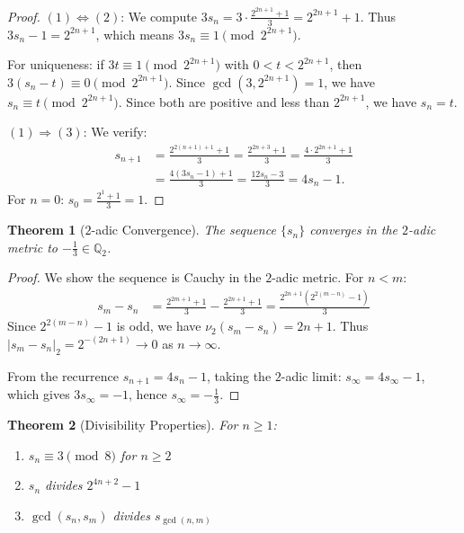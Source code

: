 \documentclass[11pt]{article}
\newtheorem{theorem}{Theorem}[section]
\theoremstyle{definition}
\newcommand{\Q}{\mathbb{Q}}
\begin{document}
\begin{proof}
$(1) \Leftrightarrow (2)$: We compute $3s_n = 3 \cdot \frac{2^{2n+1} + 1}{3} = 2^{2n+1} + 1$.
Thus $3s_n - 1 = 2^{2n+1}$, which means $3s_n \equiv 1 \pmod{2^{2n+1}}$.

For uniqueness: if $3t \equiv 1 \pmod{2^{2n+1}}$ with $0 < t < 2^{2n+1}$, then $3(s_n - t) \equiv 0 \pmod{2^{2n+1}}$. Since $\gcd(3, 2^{2n+1}) = 1$, we have $s_n \equiv t \pmod{2^{2n+1}}$. Since both are positive and less than $2^{2n+1}$, we have $s_n = t$.

$(1) \Rightarrow (3)$: We verify:
\begin{align}
s_{n+1} &= \frac{2^{2(n+1)+1} + 1}{3} = \frac{2^{2n+3} + 1}{3} = \frac{4 \cdot 2^{2n+1} + 1}{3}\\
&= \frac{4(3s_n - 1) + 1}{3} = \frac{12s_n - 3}{3} = 4s_n - 1.
\end{align}
For $n = 0$: $s_0 = \frac{2^1 + 1}{3} = 1$.
\end{proof}

\begin{theorem}[$2$-adic Convergence]\label{thm:2adic}
The sequence $\{s_n\}$ converges in the $2$-adic metric to $-\frac{1}{3} \in \Q_2$.
\end{theorem}

\begin{proof}
We show the sequence is Cauchy in the $2$-adic metric. For $n < m$:
\begin{align}
s_m - s_n &= \frac{2^{2m+1} + 1}{3} - \frac{2^{2n+1} + 1}{3} = \frac{2^{2n+1}(2^{2(m-n)} - 1)}{3}
\end{align}
Since $2^{2(m-n)} - 1$ is odd, we have $\nu_2(s_m - s_n) = 2n + 1$.
Thus $|s_m - s_n|_2 = 2^{-(2n+1)} \to 0$ as $n \to \infty$.

From the recurrence $s_{n+1} = 4s_n - 1$, taking the $2$-adic limit:
$s_\infty = 4s_\infty - 1$, which gives $3s_\infty = -1$, hence $s_\infty = -\frac{1}{3}$.
\end{proof}

\begin{theorem}[Divisibility Properties]\label{thm:divisibility}
For $n \geq 1$:
\begin{enumerate}
\item $s_n \equiv 3 \pmod{8}$ for $n \geq 2$
\item $s_n$ divides $2^{4n+2} - 1$
\item $\gcd(s_n, s_m)$ divides $s_{\gcd(n,m)}$
\end{enumerate}
\end{theorem}
\end{document}
